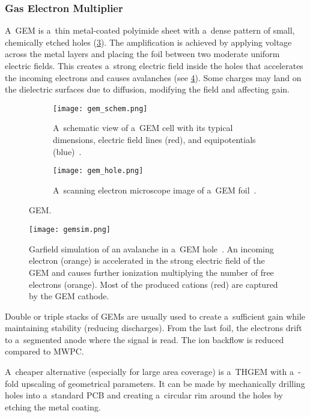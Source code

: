 			\subsubsection{Gas Electron Multiplier}
				A~\acf{GEM} is a~thin metal-coated polyimide sheet with a~dense pattern of small, chemically etched holes (\cref{fig:gem}). The amplification is achieved by applying voltage across the metal layers and placing the foil between two moderate uniform electric fields. This creates a~strong electric field inside the holes that accelerates the incoming electrons and causes avalanches (see \cref{fig:gemsim}). Some charges may land on the dielectric surfaces due to diffusion, modifying the field and affecting gain.
				
				\begin{figure}
					\centering
					\begin{subfigure}[t]{0.48\textwidth}
						\centering
						\texttt{[image: gem\_schem.png]}
						\caption{A~schematic view of a~\ac{GEM} cell with its typical dimensions, electric field lines (red), and equipotentials (blue)~\cite{pdg2024}.}
						\label{fig:gem_schem}
					\end{subfigure}
					\hfill
					\begin{subfigure}[t]{0.48\textwidth}
						\centering
						\texttt{[image: gem\_hole.png]}
						\caption{A~scanning electron microscope image of a~\ac{GEM} foil~\cite{gemhole}.}
						\label{fig:gemhole}
					\end{subfigure}
					\caption{\acf{GEM}.}
					\label{fig:gem}
				\end{figure}
				\begin{figure}
					\centering
					\texttt{[image: gemsim.png]}
					\caption{Garfield simulation of an avalanche in a~\ac{GEM} hole~\cite{gemsim}. An incoming electron (orange) is accelerated in the strong electric field of the \ac{GEM} and causes further ionization multiplying the number of free electrons (orange). Most of the produced cations (red) are captured by the \ac{GEM} cathode.}
					\label{fig:gemsim}
				\end{figure}
				
				Double or triple stacks of \acp{GEM} are usually used to create a~sufficient gain while maintaining stability (reducing discharges). From the last foil, the electrons drift to a~segmented anode where the signal is read. The ion backflow is reduced compared to \ac{MWPC}.
				
				A~cheaper alternative (especially for large area coverage) is a~\ac{THGEM} with a~\nobreakdash-fold upscaling of geometrical parameters. It can be made by mechanically drilling holes into a~standard \ac{PCB} and creating a~circular rim around the holes by etching the metal coating.
			
